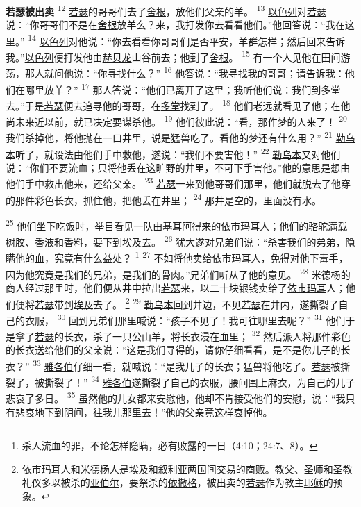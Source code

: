 \textbf{若瑟被出卖\quad}
\textsuperscript{12}
\uline{若瑟}的哥哥们去了\uline{舍根}，放他们父亲的羊。
\textsuperscript{13}
\uline{以色列}对\uline{若瑟}说：“你哥哥们不是在\uline{舍根}放羊么？来，我打发你去看看他们。”他回答说：“我在这里。”
\textsuperscript{14}
\uline{以色列}对他说：“你去看看你哥哥们是否平安，羊群怎样；然后回来告诉我。”\uline{以色列}便打发他由\uline{赫贝龙}山谷前去；他到了\uline{舍根}。
\textsuperscript{15}
有一个人见他在田间游荡，那人就问他说：“你寻找什么？”
\textsuperscript{16}
他答说：“我寻找我的哥哥；请告诉我：他们在哪里放羊？”
\textsuperscript{17}
那人答说：“他们已离开了这里；我听他们说：我们到\uline{多堂}去。”于是\uline{若瑟}便去追寻他的哥哥，在\uline{多堂}找到了。
\textsuperscript{18}
他们老远就看见了他；在他尚未来近以前，就已决定要谋杀他。
\textsuperscript{19}
他们彼此说：“看，那作梦的人来了！
\textsuperscript{20}
我们杀掉他，将他抛在一口井里，说是猛兽吃了。看他的梦还有什么用？”
\textsuperscript{21}
\uline{勒乌本}听了，就设法由他们手中救他，遂说：“我们不要害他！”
\textsuperscript{22}
\uline{勒乌本}又对他们说：“你们不要流血；只将他丢在这旷野的井里，不可下手害他。”他的意思是想由他们手中救出他来，还给父亲。
\textsuperscript{23}
\uline{若瑟}一来到他哥哥们那里，他们就脱去了他穿的那件彩色长衣，抓住他，把他丢在井里；
\textsuperscript{24}
那井是空的，里面没有水。

\textsuperscript{25}
他们坐下吃饭时，举目看见一队由\uline{基耳}\uline{阿得}来的\uline{依市}\uline{玛耳}人；他们的骆驼满载树胶、香液和香料，要下到\uline{埃及}去。
\textsuperscript{26}
\uline{犹大}遂对兄弟们说：“杀害我们的弟弟，隐瞒他的血，究竟有什么益处？
\footnote{杀人流血的罪，不论怎样隐瞒，必有败露的一日（4:10；24:7、8）。}
\textsuperscript{27}
不如将他卖给\uline{依市}\uline{玛耳}人，免得对他下毒手，因为他究竟是我们的兄弟，是我们的骨肉。”兄弟们听从了他的意见。
\textsuperscript{28}
\uline{米德杨}的商人经过那里时，他们便从井中拉出\uline{若瑟}来，以二十块银钱卖给了\uline{依市}\uline{玛耳}人；他们便将\uline{若瑟}带到\uline{埃及}去了。
\footnote{\uline{依市玛耳}人和\uline{米德杨}人是\uline{埃及}和\uline{叙利亚}两国间交易的商贩。教父、圣师和圣教礼仪多以被杀的\uline{亚伯尔}，要祭杀的\uline{依撒格}，被出卖的\uline{若瑟}作为教主\uline{耶稣}的预象。}
\textsuperscript{29}
\uline{勒乌本}回到井边，不见\uline{若瑟}在井内，遂撕裂了自己的衣服，
\textsuperscript{30}
回到兄弟们那里喊说：“孩子不见了！我可往哪里去呢？”
\textsuperscript{31}
他们于是拿了\uline{若瑟}的长衣，杀了一只公山羊，将长衣浸在血里；
\textsuperscript{32}
然后派人将那件彩色的长衣送给他们的父亲说：“这是我们寻得的，请你仔细看看，是不是你儿子的长衣？”
\textsuperscript{33}
\uline{雅各伯}仔细一看，就喊说：“是我儿子的长衣；猛兽将他吃了。\uline{若瑟}被撕裂了，被撕裂了！”
\textsuperscript{34}
\uline{雅各伯}遂撕裂了自己的衣服，腰间围上麻衣，为自己的儿子悲哀了多日。
\textsuperscript{35}
虽然他的儿女都来安慰他，他却不肯接受他们的安慰，说：“我只有悲哀地下到阴间，往我儿那里去！”他的父亲竟这样哀悼他。


